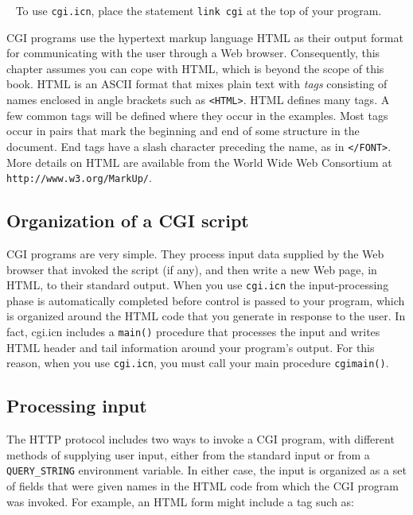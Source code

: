 \medskip{}\ {\sffamily
To use \texttt{cgi.icn}, place the statement \texttt{link cgi}
at the top of your program.}\medskip

CGI programs use the hypertext markup language HTML as their output
format for communicating with the user through a Web browser.
Consequently, this chapter assumes you can cope with HTML, which is
beyond the scope of this book. HTML is an ASCII format that mixes plain
text with \textit{tags} consisting of names enclosed in angle brackets
such as \texttt{{\textless}HTML{\textgreater}}. HTML defines many tags.
A few common tags will be defined where they occur in the examples.
Most tags occur in pairs that mark the beginning and end of some
structure in the document. End tags have a slash character preceding
the name, as in \texttt{{\textless}/FONT{\textgreater}}. More details
on HTML are available from the World Wide Web Consortium at
\texttt{http://www.w3.org/MarkUp/}.

\subsection*{Organization of a CGI script}

CGI programs are very simple. They process input data supplied by the
Web browser that invoked the script (if any), and then write a new Web
page, in HTML, to their standard output. When you use \texttt{cgi.icn}
the input-processing phase is automatically completed before control is
passed to your program, which is organized around the HTML code that
you generate in response to the user. In fact, cgi.icn includes a
\texttt{main()} procedure that processes the input and writes HTML
header and tail information around your program's
output. For this reason,
when you use \texttt{cgi.icn}, you must call your main procedure
\texttt{cgimain()}.

\subsection*{Processing input}

The HTTP protocol includes two ways to invoke a CGI program,
with different methods of supplying user input, either from the
standard input or from a \texttt{QUERY\_STRING} environment variable.
In either case, the input is organized as a set of fields that were
given names in the HTML code from which the CGI program was invoked.
For example, an HTML form might include a tag such as:

